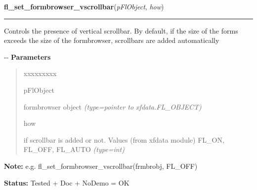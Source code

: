 \hspace{.8\funcindent}\begin{boxedminipage}{\funcwidth}

    \raggedright \textbf{fl\_set\_formbrowser\_vscrollbar}(\textit{pFlObject}, \textit{how})

    \vspace{-1.5ex}

    \rule{\textwidth}{0.5\fboxrule}
\setlength{\parskip}{2ex}

Controls the presence of vertical scrollbar. By default, if the size of
the forms exceeds the size of the formbrowser, scrollbars are added
automatically

-{}-
\setlength{\parskip}{1ex}
      \textbf{Parameters}
      \vspace{-1ex}

      \begin{quote}
        \begin{Ventry}{xxxxxxxxx}

          \item[pFlObject]


formbrowser object
            {\it (type=pointer to xfdata.FL\_OBJECT)}

          \item[how]


if scrollbar is added or not. Values (from xfdata module) FL\_ON,
FL\_OFF, FL\_AUTO
            {\it (type=int)}

        \end{Ventry}

      \end{quote}

\textbf{Note:} 
e.g. fl\_set\_formbrowser\_vscrollbar(frmbrobj, FL\_OFF)


\textbf{Status:} 
Tested + Doc + NoDemo = OK


    \end{boxedminipage}

    \label{xformslib:flformbrowser:fl_get_formbrowser_topform}

    \vspace{0.5ex}

